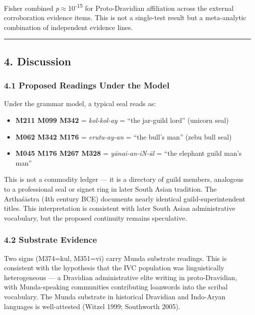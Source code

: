 \documentclass[
  11pt,
]{article}
\providecommand{\tightlist}{%
  \setlength{\itemsep}{0pt}\setlength{\parskip}{0pt}}
\begin{document}
Fisher combined \emph{p}$\approx$10\textsuperscript{-15} for Proto-Dravidian
affiliation across the external corroboration evidence items. This is
not a single-test result but a meta-analytic combination of independent
evidence lines.

\begin{center}\rule{0.5\linewidth}{0.5pt}\end{center}

\subsection{4. Discussion}\label{discussion}

\subsubsection{4.1 Proposed Readings Under the
Model}\label{proposed-readings-under-the-model}

Under the grammar model, a typical seal reads as:

\begin{itemize}
\tightlist
\item
  \textbf{M211 M099 M342} = \emph{kol-kol-ay} = ``the jar-guild lord''
  (unicorn seal)
\item
  \textbf{M062 M342 M176} = \emph{erutu-ay-an} = ``the bull's man''
  (zebu bull seal)
\item
  \textbf{M045 M176 M267 M328} = \emph{yānai-an-iN-āl} = ``the elephant
  guild man's man''
\end{itemize}

This is not a commodity ledger --- it is a directory of guild members,
analogous to a professional seal or signet ring in later South Asian
tradition. The Arthaśāstra (4th century BCE) documents nearly identical
guild-superintendent titles. This interpretation is consistent with
later South Asian administrative vocabulary, but the proposed continuity
remains speculative.

\subsubsection{4.2 Substrate Evidence}\label{substrate-evidence}

Two signs (M374=kul, M351=vī) carry Munda substrate readings. This is
consistent with the hypothesis that the IVC population was
linguistically heterogeneous --- a Dravidian administrative elite
writing in proto-Dravidian, with Munda-speaking communities contributing
loanwords into the scribal vocabulary. The Munda substrate in historical
Dravidian and Indo-Aryan languages is well-attested (Witzel 1999;
Southworth 2005).
\end{document}
